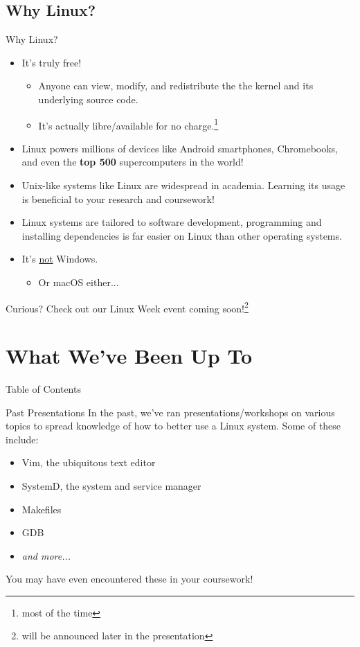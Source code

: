 \documentclass{beamer}
\begin{document}
\subsection{Why Linux?}
\begin{frame}{Why Linux?}
	\begin{itemize}
		\item It's truly free!
			\pause
			\begin{itemize}
				\item Anyone can view, modify, and redistribute
					the the kernel and its underlying
					source code.
					\pause
				\item It's actually libre/available for no
					charge.\footnote{most of the time}
					\pause
			\end{itemize}
		\item Linux powers millions of devices like Android
			smartphones, Chromebooks, and even the \textbf{top 500}
			supercomputers in the world!
			\pause
		\item Unix-like systems like Linux are widespread in academia.
			Learning its usage is beneficial to your research and
			coursework!
			\pause
		\item Linux systems are tailored to software development,
			programming and installing dependencies is far easier
			on Linux than other operating systems.
			\pause
		\item It's \underline{not} Windows.
			\pause
			\begin{itemize}
				\item Or macOS either...
			\end{itemize}
			\pause
	\end{itemize}
	Curious? Check out our Linux Week event coming soon!\footnote{will be
	announced later in the presentation}
\end{frame}

\section{What We've Been Up To}
\begin{frame}{Table of Contents}
	\tableofcontents[currentsection]
\end{frame}

\begin{frame}{Past Presentations}
	In the past, we've ran presentations/workshops on various topics to
	spread knowledge of how to better use a Linux system. Some of these
	include:
	\pause
	\begin{itemize}
		\item Vim, the ubiquitous text editor
			\pause
		\item SystemD, the system and service manager
			\pause
		\item Makefiles
			\pause
		\item GDB
			\pause
		\item \textit{and more...}
			\pause
	\end{itemize}
	You may have even encountered these in your coursework!
\end{frame}
\end{document}
